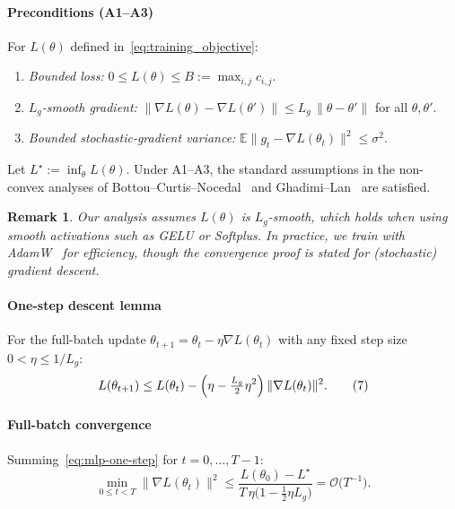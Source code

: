 \documentclass[journal]{IEEEtran}
\newtheorem{remark}{Remark}
\begin{document}
    \paragraph{Preconditions (A1--A3)}
    For $L(\theta)$ defined in~\eqref{eq:training_objective}:
    \begin{enumerate}[label=A\arabic{*}., leftmargin=2.0em]
        \item \emph{Bounded loss:} $0 \le L(\theta) \le B := \max_{i,j}c_{i,j}$.

        \item \emph{$L_{g}$-smooth gradient:}
            $\|\nabla L(\theta)-\nabla L(\theta')\| \le L_{g}\,\|\theta-\theta'\|$
            for all $\theta,\theta'$.

        \item \emph{Bounded stochastic-gradient variance:}
            $\mathbb{E}\bigl\|g_{t}-\nabla L(\theta_{t})\bigr\|^{2}\le \sigma^{2}$.
    \end{enumerate}
    Let $L^{\star}:= \inf_{\theta}L(\theta)$. Under A1--A3, the standard
    assumptions in the non-convex analyses of Bottou--Curtis--Nocedal~\cite{bottou2018optimization}
    and Ghadimi--Lan~\cite{ghadimi2013stochastic} are satisfied.

    \begin{remark}
        Our analysis assumes $L(\theta)$ is $L_{g}$-smooth, which holds when
        using smooth activations such as GELU or Softplus. In practice, we train
        with AdamW~\cite{loshchilov2019adamw} for efficiency, though the convergence
        proof is stated for (stochastic) gradient descent.
    \end{remark}

    \paragraph{One-step descent lemma}
    For the full-batch update $\theta_{t+1}=\theta_{t}-\eta\nabla L(\theta_{t})$
    with any fixed step size $0<\eta\le 1/L_{g}$:
    \[
        L(\theta_{t+1}) \le L(\theta_{t}) - \Bigl(\eta-\tfrac{L_g}{2}\eta^{2}\Bigr
        )\,\|\nabla L(\theta_{t})\|^{2}. \tag{7}\label{eq:mlp-one-step}
    \]

    \paragraph{Full-batch convergence}
    Summing~\eqref{eq:mlp-one-step} for $t=0,\dots,T-1$:
    \[
        \min_{0\le t<T}\|\nabla L(\theta_{t})\|^{2}\le \frac{L(\theta_{0})-L^{\star}}{T\,\eta\bigl(1-\tfrac12\eta
        L_{g}\bigr)}=\mathcal{O}\!\bigl(T^{-1}\bigr). \tag{8}\label{eq:two-step}
    \]
\end{document}
